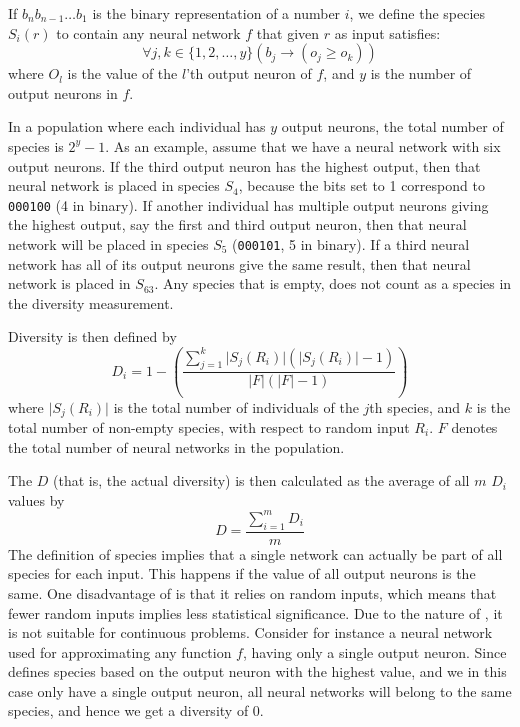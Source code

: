 If $b_nb_{n-1}\dots b_1$ is the binary representation of a number $i$,
we define the species $S_i(r)$ to contain any neural network $f$ that given $r$ as input satisfies:
%
\[
  \forall j,k \in \{1,2,\dots,y\} \left(b_j \rightarrow \left(o_j \geq o_k\right)\right)
\]
%
where $O_l$ is the value of the $l$'th output neuron of $f$, and $y$ is the number of output neurons in $f$.

In a population where each individual has $y$ output neurons, the total number of species is $2^y - 1$.  As an example, assume that we have a neural network with six output neurons. If the third output neuron has the highest output, then that neural network is placed in species $S_4$, because the bits set to 1 correspond to \texttt{000100} (4 in binary). If another individual has multiple output neurons giving the highest output, say the first and third output neuron, then that neural network will be placed in species $S_5$ (\texttt{000101}, 5 in binary). If a third neural network has all of its output neurons give the same result, then that neural network is placed in $S_{63}$. Any species that is empty, does not count as a species in the diversity measurement.

Diversity is then defined by
%
\begin{equation*}\label{eq:sdi}
  D_i = 1 - \left(\frac{\sum_{j=1}^{k}\lvert S_j\left(R_i\right)\rvert\left(\lvert S_j\left(R_i\right)\rvert - 1\right)}{\lvert F\rvert \left(\lvert F\rvert - 1\right)}\right) 
\end{equation*}
%
where $\lvert S_j(R_i)\rvert$ is the total number of individuals of the $j$th species, and $k$ is the total number of non-empty species, with respect to random input $R_i$. %
$F$ denotes the total number of neural networks in the population. 

The \dia{} $D$ (that is, the actual diversity) is then calculated as the average of all $m$ $D_i$ values by
%
\[
D =\frac{\sum_{i=1}^m{D_i}}{m}
\]
%
The definition of species implies that a single network can actually be part of all species for each input. This happens if the value of all output neurons is the same. One disadvantage of \dia{} is that it relies on random inputs, which means that fewer random inputs implies less statistical significance. Due to the nature of \dia, it is not suitable for continuous problems. Consider for instance a neural network used for approximating any function $f$, having only a single output neuron. Since \dia{} defines species based on the output neuron with the highest value, and we in this case only have a single output neuron, all neural networks will belong to the same species, and hence we get a diversity of 0.  
